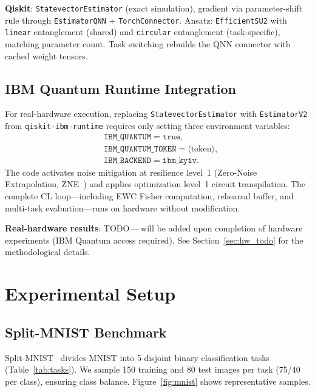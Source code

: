 \documentclass[a4paper,nopdfoutputerror]{quantumarticle}
\begin{document}
\textbf{Qiskit}: \texttt{StatevectorEstimator} (exact simulation), gradient via
parameter-shift rule through \texttt{EstimatorQNN} + \texttt{TorchConnector}.
Ansatz: \texttt{EfficientSU2} with \texttt{linear} entanglement (shared) and
\texttt{circular} entanglement (task-specific), matching parameter count.
Task switching rebuilds the QNN connector with cached weight tensors.

\subsection{IBM Quantum Runtime Integration}
\label{sec:ibm}

For real-hardware execution, replacing \texttt{StatevectorEstimator} with
\texttt{EstimatorV2} from \texttt{qiskit-ibm-runtime} requires only setting
three environment variables:
\begin{align*}
  &\texttt{IBM\_QUANTUM}=\texttt{true},\\
  &\texttt{IBM\_QUANTUM\_TOKEN}=\langle\text{token}\rangle,\\
  &\texttt{IBM\_BACKEND}=\texttt{ibm\_kyiv}.
\end{align*}
The code activates noise mitigation at resilience level~1 (Zero-Noise
Extrapolation, ZNE~\cite{li2017efficient}) and applies optimization level~1
circuit transpilation.
The complete CL loop---including EWC Fisher computation, rehearsal buffer,
and multi-task evaluation---runs on hardware without modification.

\textbf{Real-hardware results}: TODO\,---\,will be added upon completion
of hardware experiments (IBM Quantum access required).
See Section~\ref{sec:hw_todo} for the methodological details.


\section{Experimental Setup}
\label{sec:setup}

\subsection{Split-MNIST Benchmark}

Split-MNIST~\cite{lecun1998,zenke2017continual} divides MNIST into 5 disjoint
binary classification tasks (Table~\ref{tab:tasks}).
We sample 150 training and 80 test images per task (75/40 per class),
ensuring class balance.
Figure~\ref{fig:mnist} shows representative samples.
\end{document}
